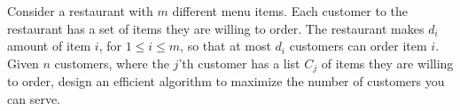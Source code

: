\problem{}
Consider a restaurant with $m$ different menu items.  Each customer to the restaurant has a set of items they are willing to order.  The restaurant makes $d_i$ amount of item $i$, for $1 \leq i \leq m$, so that at most $d_i$ customers can order item $i$.  Given $n$ customers, where the $j$'th customer has a list $C_j$ of items they are willing to order, design an efficient algorithm to maximize the number of customers you can serve.  

\solution{
}

\newpage